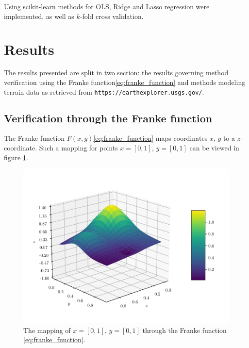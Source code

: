 \documentclass[11pt]{article}
\begin{document}
Using scikit-learn\cite{scikit-learn} methods for OLS, Ridge and Lasso regression were implemented, as well as $k$-fold cross validation.

\section{Results}
The results presented are split in two section: the results governing method verification using the Franke function\eqref{eq:franke_function} and methods modeling terrain data as retrieved from \texttt{https://earthexplorer.usgs.gov/}.

\subsection{Verification through the Franke function}
The Franke function $F(x,y)$\eqref{eq:franke_function} maps coordinates $x$, $y$ to a $z$-coordinate. Such a mapping for points $x=[0,1]$, $y=[0,1]$ can be viewed in figure \ref{fig:franke_function}.
\begin{figure}
    \centering
    \includegraphics[scale=1.0]{../fig/franke_function.pdf}
    \caption{The mapping of $x=[0,1]$, $y=[0,1]$ through the Franke function \eqref{eq:franke_function}.}
    \label{fig:franke_function}
\end{figure}
\end{document}
